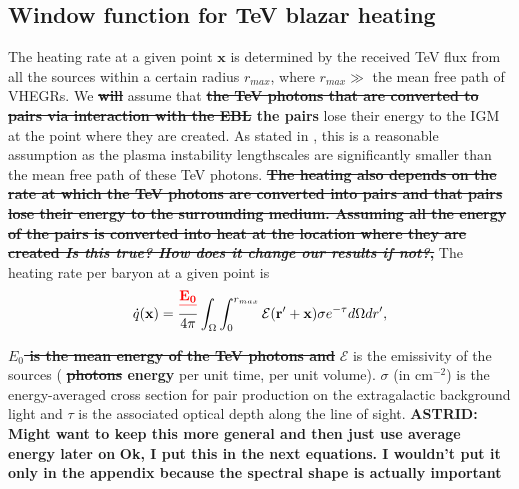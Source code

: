 \documentclass[twocolumns]{emulateapj}
\newcommand\ALc[1]{{\color{red} \bf #1}} %
\newcommand\Pc[1]{{\color{cyan} \bf #1}} %
\begin{document}
\ALc{\subsection{Window function for TeV blazar heating}}
The heating rate at a given point $\mathbf{x}$ is determined by the received TeV flux from all the sources within a certain radius $r_{max}$, where $r_{max} \gg $ the mean free path of VHEGRs. We \ALc{\sout{will}} assume that \ALc{\sout{ the TeV photons that are converted to pairs via interaction with the EBL} the pairs} lose their energy to the IGM at the point where they are created.  As stated in \citet{2012ApJ...752...22B}, this is a reasonable assumption as the plasma instability lengthscales are significantly smaller than the mean free path of these TeV photons. \ALc{\sout{ The heating also depends on the rate at which the TeV photons are converted into pairs and that pairs lose their energy to the surrounding medium.  Assuming all the energy of the pairs is converted into heat at the location where they are created \textit{Is this true? How does it change our results if not?}, }}
The heating rate per baryon at a given point is
\begin{equation}
\label{eq:heating_rate}
  \dot{q}(\mathbf{x})= \frac{\ALc{\sout{E_0}}}{4\pi}  \int_{\Omega}\int_0^{r_{max}}   \mathcal{E}(\mathbf{r}'+\mathbf{x})\sigma  e^{-\tau}d\Omega dr' ,
\end{equation}

\ALc{\sout {$E_0$ is the mean energy of the TeV photons and }}  $\mathcal{E}$ is the emissivity of the sources (\ALc{\sout{photons} energy} per unit time, per unit volume). $\sigma$ (in cm$^{-2}$) is the energy-averaged cross section for pair production on the extragalactic background light and $\tau$ is the associated optical depth along the line of sight. %
\Pc{ASTRID: Might want to keep this more general and then just use average energy later on}
\ALc{Ok, I put this in the next equations. I wouldn't put it only in the appendix because the spectral shape is actually important}
\end{document}
